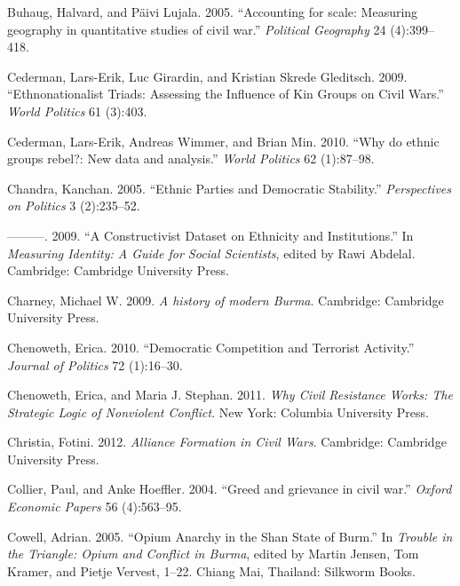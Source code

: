 \documentclass[12pt,]{book}
\theoremstyle{definition}
\theoremstyle{definition}
\theoremstyle{definition}
\theoremstyle{remark}
\begin{document}
\leavevmode\hypertarget{ref-Buhaug2005}{}%
Buhaug, Halvard, and Päivi Lujala. 2005. ``Accounting for scale:
Measuring geography in quantitative studies of civil war.''
\emph{Political Geography} 24 (4):399--418.

\leavevmode\hypertarget{ref-Cederman2009}{}%
Cederman, Lars-Erik, Luc Girardin, and Kristian Skrede Gleditsch. 2009.
``Ethnonationalist Triads: Assessing the Influence of Kin Groups on
Civil Wars.'' \emph{World Politics} 61 (3):403.

\leavevmode\hypertarget{ref-Cederman2010}{}%
Cederman, Lars-Erik, Andreas Wimmer, and Brian Min. 2010. ``Why do
ethnic groups rebel?: New data and analysis.'' \emph{World Politics} 62
(1):87--98.

\leavevmode\hypertarget{ref-Chandra2005}{}%
Chandra, Kanchan. 2005. ``Ethnic Parties and Democratic Stability.''
\emph{Perspectives on Politics} 3 (2):235--52.

\leavevmode\hypertarget{ref-Chandra2009a}{}%
---------. 2009. ``A Constructivist Dataset on Ethnicity and
Institutions.'' In \emph{Measuring Identity: A Guide for Social
Scientists}, edited by Rawi Abdelal. Cambridge: Cambridge University
Press.

\leavevmode\hypertarget{ref-Charney2009}{}%
Charney, Michael W. 2009. \emph{A history of modern Burma}. Cambridge:
Cambridge University Press.

\leavevmode\hypertarget{ref-Chenoweth2010}{}%
Chenoweth, Erica. 2010. ``Democratic Competition and Terrorist
Activity.'' \emph{Journal of Politics} 72 (1):16--30.

\leavevmode\hypertarget{ref-Chenoweth2011}{}%
Chenoweth, Erica, and Maria J. Stephan. 2011. \emph{Why Civil Resistance
Works: The Strategic Logic of Nonviolent Conflict}. New York: Columbia
University Press.

\leavevmode\hypertarget{ref-Christia2012}{}%
Christia, Fotini. 2012. \emph{Alliance Formation in Civil Wars}.
Cambridge: Cambridge University Press.

\leavevmode\hypertarget{ref-Collier2004}{}%
Collier, Paul, and Anke Hoeffler. 2004. ``Greed and grievance in civil
war.'' \emph{Oxford Economic Papers} 56 (4):563--95.

\leavevmode\hypertarget{ref-Cowell2005}{}%
Cowell, Adrian. 2005. ``Opium Anarchy in the Shan State of Burm.'' In
\emph{Trouble in the Triangle: Opium and Conflict in Burma}, edited by
Martin Jensen, Tom Kramer, and Pietje Vervest, 1--22. Chiang Mai,
Thailand: Silkworm Books.
\end{document}
